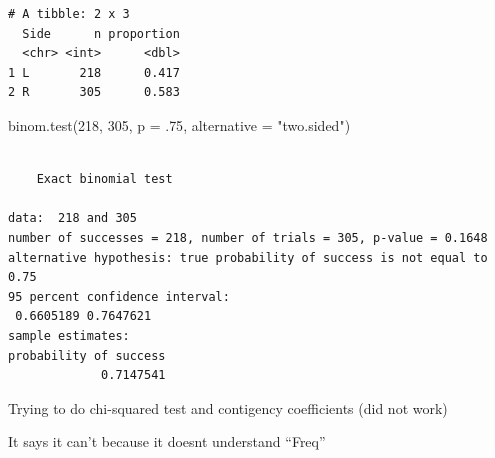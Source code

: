 \documentclass[
  letterpaper,
  DIV=11,
  numbers=noendperiod]{scrartcl}
\newenvironment{Shaded}{\begin{snugshade}}{\end{snugshade}}
\newcommand{\AttributeTok}[1]{\textcolor[rgb]{0.40,0.45,0.13}{#1}}
\newcommand{\CommentTok}[1]{\textcolor[rgb]{0.37,0.37,0.37}{#1}}
\newcommand{\DecValTok}[1]{\textcolor[rgb]{0.68,0.00,0.00}{#1}}
\newcommand{\FunctionTok}[1]{\textcolor[rgb]{0.28,0.35,0.67}{#1}}
\newcommand{\NormalTok}[1]{\textcolor[rgb]{0.00,0.23,0.31}{#1}}
\newcommand{\StringTok}[1]{\textcolor[rgb]{0.13,0.47,0.30}{#1}}
\begin{document}
\begin{verbatim}
# A tibble: 2 x 3
  Side      n proportion
  <chr> <int>      <dbl>
1 L       218      0.417
2 R       305      0.583
\end{verbatim}

\begin{Shaded}
\begin{Highlighting}[]
\FunctionTok{binom.test}\NormalTok{(}\DecValTok{218}\NormalTok{, }\DecValTok{305}\NormalTok{, }\AttributeTok{p =}\NormalTok{ .}\DecValTok{75}\NormalTok{, }\AttributeTok{alternative =} \StringTok{"two.sided"}\NormalTok{)}
\end{Highlighting}
\end{Shaded}

\begin{verbatim}

    Exact binomial test

data:  218 and 305
number of successes = 218, number of trials = 305, p-value = 0.1648
alternative hypothesis: true probability of success is not equal to 0.75
95 percent confidence interval:
 0.6605189 0.7647621
sample estimates:
probability of success 
             0.7147541 
\end{verbatim}

Trying to do chi-squared test and contigency coefficients (did not work)

\begin{Shaded}
\end{Shaded}

It says it can't because it doesnt understand ``Freq''
\end{document}
